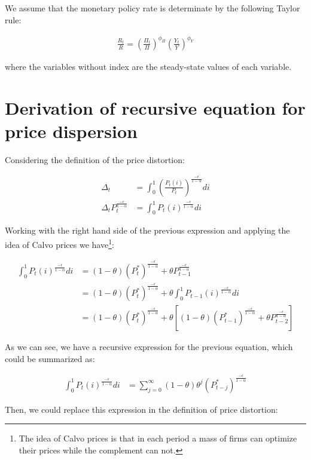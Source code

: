 \documentclass[11pt]{article}
\begin{document}
We assume that the monetary policy rate is determinate by the following Taylor rule:

\begin{align*}
\frac{R_t}{R}=\left(\frac{\Pi_t}{\Pi}\right)^{\phi_{\Pi}}\left(\frac{Y_t}{Y}\right)^{\phi_Y}
\end{align*}

where the variables without index are the steady-state values of each variable.

\section{Derivation of recursive equation for price dispersion}\label{app:recursive_price_disp}

Considering the definition of the price distortion:

\begin{align*}
\Delta_t&=\int_0^1 \left(\frac{P_t(i)}{P_t}\right)^{\frac{-\epsilon}{1-\alpha}}di\\
\Delta_t P_t^{\frac{-\epsilon}{1-\alpha}}&=\int_0^1 P_t(i)^{\frac{-\epsilon}{1-\alpha}}di
\end{align*}

Working with the right hand side of the previous expression and applying the idea of Calvo prices we have\footnote{The idea of Calvo prices is that in each period a mass of firms can optimize their prices while the complement can not.}:

\begin{align*}
\int_0^1 P_t(i)^{\frac{-\epsilon}{1-\alpha}}di&=(1-\theta)(P_t^*)^{\frac{-\epsilon}{1-\alpha}}+\theta P_{t-1}^{\frac{-\epsilon}{1-\alpha}}\\
&=(1-\theta)(P_t^*)^{\frac{-\epsilon}{1-\alpha}}+\theta \int_0^1 P_{t-1}(i)^{\frac{-\epsilon}{1-\alpha}}di\\
&=(1-\theta)(P_t^*)^{\frac{-\epsilon}{1-\alpha}}+\theta \left[(1-\theta)(P_{t-1}^*)^{\frac{-\epsilon}{1-\alpha}}+\theta P_{t-2}^{\frac{-\epsilon}{1-\alpha}}\right]
\end{align*}

As we can see, we have a recursive expression for the previous equation, which could be summarized as:

\begin{align*}
\int_0^1 P_t(i)^{\frac{-\epsilon}{1-\alpha}}di&=\sum_{j=0}^{\infty}(1-\theta)\theta^j(P_{t-j}^*)^{\frac{-\epsilon}{1-\alpha}}
\end{align*}

Then, we could replace this expression in the definition of price distortion:
\end{document}
